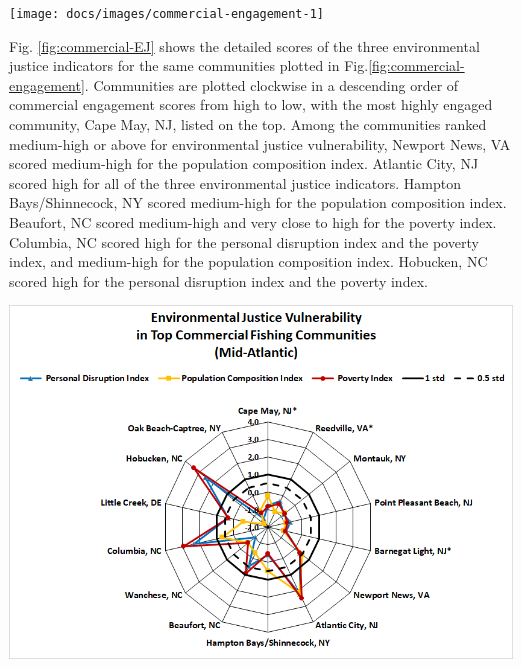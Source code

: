 \documentclass[
  10pt,
]{article}
\let\origfigure\figure
\let\endorigfigure\endfigure
\renewenvironment{figure}[1][2] {
    \expandafter\origfigure\expandafter[H]
} {
    \endorigfigure
}
\begin{document}
\begin{figure}

{\centering \texttt{[image: docs/images/commercial-engagement-1]} 

}

\caption{Commercial engagement, reliance, and environmental justice vulnerability for the top commercially engaged and reliant fishing communities in the Mid-Atlantic.  Communities ranked medium-high or above for one or more of the environmental justice indicators are highlighted in bright orange.}\label{fig:commercial-engagement}
\end{figure}

Fig. \ref{fig:commercial-EJ} shows the detailed scores of the three
environmental justice indicators for the same communities plotted in
Fig.\ref{fig:commercial-engagement}. Communities are plotted clockwise
in a descending order of commercial engagement scores from high to low,
with the most highly engaged community, Cape May, NJ, listed on the top.
Among the communities ranked medium-high or above for environmental
justice vulnerability, Newport News, VA scored medium-high for the
population composition index. Atlantic City, NJ scored high for all of
the three environmental justice indicators. Hampton Bays/Shinnecock, NY
scored medium-high for the population composition index. Beaufort, NC
scored medium-high and very close to high for the poverty index.
Columbia, NC scored high for the personal disruption index and the
poverty index, and medium-high for the population composition index.
Hobucken, NC scored high for the personal disruption index and the
poverty index.

\begin{figure}

{\centering \includegraphics[width=0.7\linewidth]{images/EJ_Commercial_MAB} 

}

\caption{Environmental justice indicators (Poverty Index, population composition index, and personal disruption index) for top commercial fishing communities in Mid-Atlantic. *Scored high (1.00 and above)) for both commercial engagement and reliance indicators}\label{fig:commercial-EJ}
\end{figure}
\end{document}

